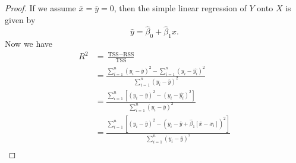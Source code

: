 
\begin{proof}
    If we assume $\bar{x} = \bar{y} = 0$, then the simple linear regression of
    $Y$ onto $X$ is given by
    \[
        \hat{y} = \hat{\beta}_0 + \hat{\beta}_1 x.
    \]
    Now we have
    \begin{equation*}
        \begin{split}
            R^2 &= \frac{\text{TSS} - \text{RSS}}{\text{TSS}} \\
                &= \frac{\sum_{i=1}^{n}{(y_i - \bar{y})}^{2} 
                - \sum_{i=1}^{n}{(y_i - \hat{y_i})}^{2}}
                {\sum_{i=1}^{n}{(y_i - \bar{y})}^{2}} \\
                &= \frac{\sum_{i=1}^{n}[{(y_i - \bar{y})}^{2} 
                - {(y_i - \hat{y_i})}^{2}]}
                {\sum_{i=1}^{n}{(y_i - \bar{y})}^{2}} \\
                &= \frac{\sum_{i=1}^{n}[{(y_i - \bar{y})}^{2} 
                - {(y_i - \bar{y} + \hat{\beta}_1 [\bar{x} - x_i])}^{2}]}
                {\sum_{i=1}^{n}{(y_i - \bar{y})}^{2}} \\
        \end{split}
    \end{equation*}
\end{proof}
